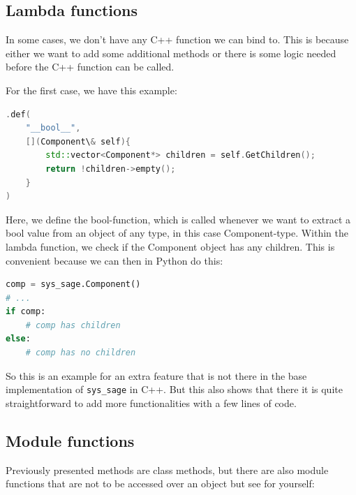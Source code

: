 
\subsection{Lambda functions}

In some cases, we don't have any C++ function we can bind to. This is because either we want to add some additional methods or there is some logic needed before the C++ function can be called.

For the first case, we have this example:
\newpage
\begin{lstlisting}[language=C++, xleftmargin=4em, frame = single]
.def(
    "__bool__",
    [](Component\& self){
        std::vector<Component*> children = self.GetChildren();
        return !children->empty();
    }
)
\end{lstlisting}

Here, we define the bool-function, which is called whenever we want to extract a bool value from an object of any type, in this case Component-type. Within the lambda function, we check if the Component object has any children. This is convenient because we can then in Python do this:

\begin{lstlisting}[language=Python,xleftmargin=4em, frame = single]
comp = sys_sage.Component()
# ...
if comp:
    # comp has children
else:
    # comp has no children
\end{lstlisting}

So this is an example for an extra feature that is not there in the base implementation of \verb|sys_sage| in C++. But this also shows that there it is quite straightforward to add more functionalities with a few lines of code.

\subsection{Module functions}

Previously presented methods are class methods, but there are also module functions that are not to be accessed over an object but see for yourself:

